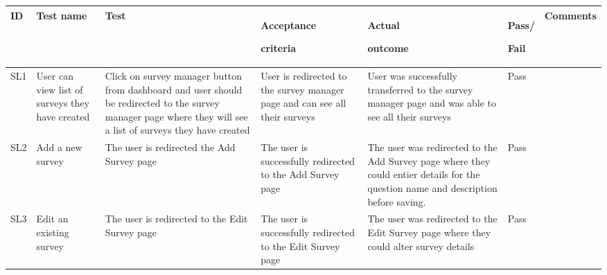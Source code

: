 \begin{longtable}{|p{}|p{}|p{}|p{}|p{}|p{}|p{}|}
  \hline
  ID  & Test name                                       & Test                                                                                                                                                                  & Acceptance \par criteria                                                    & Actual \par outcome                                                                                                                 & Pass/\par Fail & Comments\\
  \hline\hline                                                                                                                          
  SL1 & User can view list of surveys they have created & Click on survey manager button from dashboard and user should be redirected to the survey manager page where they will see a list of surveys they have created        & User is redirected to the survey manager page and can see all their surveys & User was successfully transferred to the survey manager page and was able to see all their surveys                                  & Pass           &         \\ 
  \hline
  SL2 & Add a new survey                                & The user is redirected the Add Survey page                                                                                                                            & The user is successfully redirected to the Add Survey page                  & The user was redirected to the Add Survey page where they could entier details for the question name and description before saving. & Pass           &         \\
  \hline                                                                                                                                                                                                                                 
  SL3 & Edit an existing survey                         & The user is redirected to the Edit Survey page                                                                                                                        & The user is successfully redirected to the Edit Survey page                 & The user was redirected to the Edit Survey page where they could alter survey details                                               & Pass           &         \\

\end{longtable}
